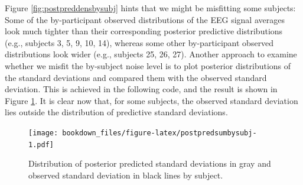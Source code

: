 \documentclass[12pt,]{krantz}
\newenvironment{Shaded}{\begin{snugshade}}{\end{snugshade}}
\newcommand{\CommentTok}[1]{\textcolor[rgb]{0.56,0.35,0.01}{\textit{#1}}}
\newcommand{\DataTypeTok}[1]{\textcolor[rgb]{0.13,0.29,0.53}{#1}}
\newcommand{\DecValTok}[1]{\textcolor[rgb]{0.00,0.00,0.81}{#1}}
\newcommand{\KeywordTok}[1]{\textcolor[rgb]{0.13,0.29,0.53}{\textbf{#1}}}
\newcommand{\NormalTok}[1]{#1}
\newcommand{\OperatorTok}[1]{\textcolor[rgb]{0.81,0.36,0.00}{\textbf{#1}}}
\newcommand{\OtherTok}[1]{\textcolor[rgb]{0.56,0.35,0.01}{#1}}
\newcommand{\StringTok}[1]{\textcolor[rgb]{0.31,0.60,0.02}{#1}}
\theoremstyle{definition}
\theoremstyle{definition}
\theoremstyle{definition}
\theoremstyle{remark}
\begin{document}
Figure \ref{fig:postpreddensbysubj} hints that we might be misfitting some subjects: Some of the by-participant observed distributions of the EEG signal averages look much tighter than their corresponding posterior predictive distributions (e.g., subjects 3, 5, 9, 10, 14), whereas some other by-participant observed distributions look wider (e.g., subjects 25, 26, 27). Another approach to examine whether we misfit the by-subject noise level is to plot posterior distributions of the standard deviations and compared them with the observed standard deviation. This is achieved in the following code, and the result is shown in Figure \ref{fig:postpredsumbysubj}. It is clear now that, for some subjects, the observed standard deviation lies outside the distribution of predictive standard deviations.



\begin{Shaded}
\end{Shaded}

\begin{figure}
\centering
\texttt{[image: bookdown\_files/figure-latex/postpredsumbysubj-1.pdf]}
\caption{\label{fig:postpredsumbysubj}Distribution of posterior predicted standard deviations in gray and observed standard deviation in black lines by subject.}
\end{figure}
\end{document}
